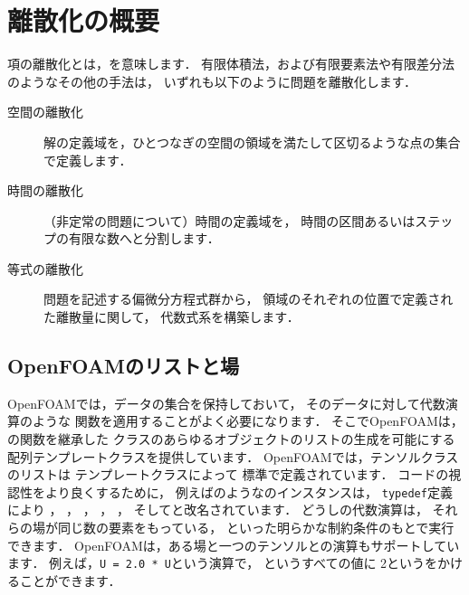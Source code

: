 \section{離散化の概要}
\label{sec:2.2}
項の離散化とは，を意味します．
有限体積法，および有限要素法や有限差分法のようなその他の手法は，
いずれも以下のように問題を離散化します．
\begin{description}
 \item[空間の離散化] 解の定義域を，ひとつなぎの空間の領域を満たして区切るような点の集合で定義します．
 \item[時間の離散化] （非定常の問題について）時間の定義域を，
            時間の区間あるいはステップの有限な数へと分割します．
 \item[等式の離散化] 問題を記述する偏微分方程式群から，
            領域のそれぞれの位置で定義された離散量に関して，
            代数式系を構築します．
\end{description}


\subsection{OpenFOAMのリストと場}
\label{ssec:2.2.1}
%
%
OpenFOAMでは，データの集合を保持しておいて，
そのデータに対して代数演算のような
関数を適用することがよく必要になります．
そこでOpenFOAMは，の関数を継承した
クラスのあらゆるオブジェクトのリストの生成を可能にする
配列テンプレートクラスを提供しています．
%
%
OpenFOAMでは，テンソルクラスのリストは
%
%
テンプレートクラスによって
標準で定義されています．
コードの視認性をより良くするために，
例えばのようなのインスタンスは，
\texttt{typedef}定義により
%
%
，
%
%
，
%
%
，
%
%
，
%
%
，
%
%
そしてと改名されています．
どうしの代数演算は，
それらの場が同じ数の要素をもっている，
といった明らかな制約条件のもとで実行できます．
OpenFOAMは，ある場と一つのテンソルとの演算もサポートしています．
例えば，\verb|U = 2.0 * U|という演算で，
というすべての値に
2というをかけることができます．



